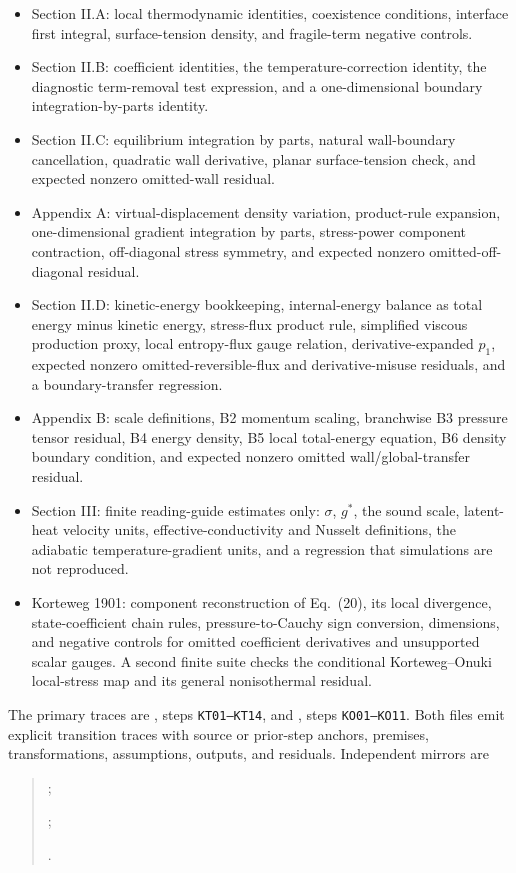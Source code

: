 \begin{itemize}
\item Section II.A: local thermodynamic identities, coexistence conditions,
  interface first integral, surface-tension density, and fragile-term negative
  controls.
\item Section II.B: coefficient identities, the temperature-correction identity,
  the diagnostic term-removal test expression, and a one-dimensional boundary
  integration-by-parts identity.
\item Section II.C: equilibrium integration by parts, natural wall-boundary
  cancellation, quadratic wall derivative, planar surface-tension check, and
  expected nonzero omitted-wall residual.
\item Appendix A: virtual-displacement density variation, product-rule
  expansion, one-dimensional gradient integration by parts, stress-power
  component contraction, off-diagonal stress symmetry, and expected nonzero
  omitted-off-diagonal residual.
\item Section II.D: kinetic-energy bookkeeping, internal-energy balance as total
  energy minus kinetic energy, stress-flux product rule, simplified viscous
  production proxy, local entropy-flux gauge relation, derivative-expanded
  \(p_1\), expected nonzero omitted-reversible-flux and derivative-misuse
  residuals, and a boundary-transfer regression.
\item Appendix B: scale definitions, B2 momentum scaling, branchwise B3 pressure
  tensor residual, B4 energy density, B5 local total-energy equation, B6 density
  boundary condition, and expected nonzero omitted wall/global-transfer
  residual.
\item Section III: finite reading-guide estimates only: \(\sigma\), \(g^*\), the
  sound scale, latent-heat velocity units, effective-conductivity and Nusselt
  definitions, the adiabatic temperature-gradient units, and a regression that
  simulations are not reproduced.
\item Korteweg 1901: component reconstruction of Eq.~(20), its local divergence,
  state-coefficient chain rules, pressure-to-Cauchy sign conversion, dimensions,
  and negative controls for omitted coefficient derivatives and unsupported
  scalar gauges.  A second finite suite checks the conditional Korteweg--Onuki
  local-stress map and its general nonisothermal residual.
\end{itemize}

The primary traces are
, steps
\texttt{KT01--KT14}, and
, steps
\texttt{KO01--KO11}.  Both files emit explicit transition traces with source
or prior-step anchors, premises, transformations, assumptions, outputs, and
residuals.  Independent mirrors are
\begin{quote}
\footnotesize\raggedright
{};\par
{};\par
{}.
\end{quote}

